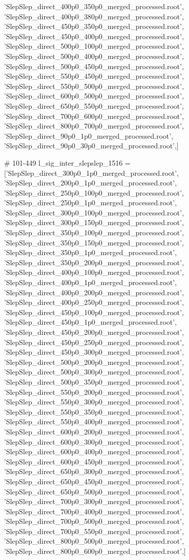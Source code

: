 'SlepSlep_direct_400p0_350p0_merged_processed.root',
'SlepSlep_direct_400p0_380p0_merged_processed.root',
'SlepSlep_direct_450p0_350p0_merged_processed.root',
'SlepSlep_direct_450p0_400p0_merged_processed.root',
'SlepSlep_direct_500p0_100p0_merged_processed.root',
'SlepSlep_direct_500p0_400p0_merged_processed.root',
'SlepSlep_direct_500p0_450p0_merged_processed.root',
'SlepSlep_direct_550p0_450p0_merged_processed.root',
'SlepSlep_direct_550p0_500p0_merged_processed.root',
'SlepSlep_direct_600p0_500p0_merged_processed.root',
'SlepSlep_direct_650p0_550p0_merged_processed.root',
'SlepSlep_direct_700p0_600p0_merged_processed.root',
'SlepSlep_direct_800p0_700p0_merged_processed.root',
'SlepSlep_direct_90p0_1p0_merged_processed.root',
'SlepSlep_direct_90p0_30p0_merged_processed.root',]

# 101-449
l_sig_inter_slepslep_1516 = ['SlepSlep_direct_300p0_1p0_merged_processed.root',
'SlepSlep_direct_200p0_1p0_merged_processed.root',
'SlepSlep_direct_250p0_100p0_merged_processed.root',
'SlepSlep_direct_250p0_1p0_merged_processed.root',
'SlepSlep_direct_300p0_100p0_merged_processed.root',
'SlepSlep_direct_300p0_150p0_merged_processed.root',
'SlepSlep_direct_350p0_100p0_merged_processed.root',
'SlepSlep_direct_350p0_150p0_merged_processed.root',
'SlepSlep_direct_350p0_1p0_merged_processed.root',
'SlepSlep_direct_350p0_200p0_merged_processed.root',
'SlepSlep_direct_400p0_100p0_merged_processed.root',
'SlepSlep_direct_400p0_1p0_merged_processed.root',
'SlepSlep_direct_400p0_200p0_merged_processed.root',
'SlepSlep_direct_400p0_250p0_merged_processed.root',
'SlepSlep_direct_450p0_100p0_merged_processed.root',
'SlepSlep_direct_450p0_1p0_merged_processed.root',
'SlepSlep_direct_450p0_200p0_merged_processed.root',
'SlepSlep_direct_450p0_250p0_merged_processed.root',
'SlepSlep_direct_450p0_300p0_merged_processed.root',
'SlepSlep_direct_500p0_200p0_merged_processed.root',
'SlepSlep_direct_500p0_300p0_merged_processed.root',
'SlepSlep_direct_500p0_350p0_merged_processed.root',
'SlepSlep_direct_550p0_200p0_merged_processed.root',
'SlepSlep_direct_550p0_300p0_merged_processed.root',
'SlepSlep_direct_550p0_350p0_merged_processed.root',
'SlepSlep_direct_550p0_400p0_merged_processed.root',
'SlepSlep_direct_600p0_200p0_merged_processed.root',
'SlepSlep_direct_600p0_300p0_merged_processed.root',
'SlepSlep_direct_600p0_400p0_merged_processed.root',
'SlepSlep_direct_600p0_450p0_merged_processed.root',
'SlepSlep_direct_650p0_300p0_merged_processed.root',
'SlepSlep_direct_650p0_450p0_merged_processed.root',
'SlepSlep_direct_650p0_500p0_merged_processed.root',
'SlepSlep_direct_700p0_300p0_merged_processed.root',
'SlepSlep_direct_700p0_400p0_merged_processed.root',
'SlepSlep_direct_700p0_500p0_merged_processed.root',
'SlepSlep_direct_700p0_550p0_merged_processed.root',
'SlepSlep_direct_800p0_500p0_merged_processed.root',
'SlepSlep_direct_800p0_600p0_merged_processed.root',]

